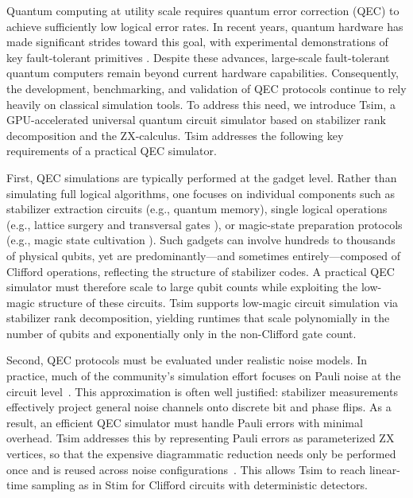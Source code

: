 \documentclass[
  a4paper,
  onecolumn,
  11pt,
  allowtoday
]{quantumarticle}
\begin{document}
Quantum computing at utility scale requires quantum error correction (QEC) to achieve sufficiently low logical error rates. In recent years, quantum hardware has made significant strides toward this goal, with experimental demonstrations of key fault-tolerant primitives \cite{google2023suppressing, ryan2024high, sales2025experimental, rosenfeld2025magic, bluvstein2026fault}. Despite these advances, large-scale fault-tolerant quantum computers remain beyond current hardware capabilities. Consequently, the development, benchmarking, and validation of QEC protocols continue to rely heavily on classical simulation tools. To address this need, we introduce Tsim, a GPU-accelerated universal quantum circuit simulator based on stabilizer rank decomposition and the ZX-calculus. Tsim addresses the following key requirements of a practical QEC simulator.

First, QEC simulations are typically performed at the gadget level. Rather than simulating full logical algorithms, one focuses on individual components such as stabilizer extraction circuits (e.g., quantum memory), single logical operations (e.g., lattice surgery and transversal gates \cite{horsman2012surface, zhou2024algorithmic}), or magic-state preparation protocols (e.g., magic state cultivation \cite{gidney2024magic}). Such gadgets can involve hundreds to thousands of physical qubits, yet are predominantly---and sometimes entirely---composed of Clifford operations, reflecting the structure of stabilizer codes. A practical QEC simulator must therefore scale to large qubit counts while exploiting the low-magic structure of these circuits.
Tsim supports low-magic circuit simulation via stabilizer rank decomposition, yielding runtimes that scale polynomially in the number of qubits and exponentially only in the non-Clifford gate count.

Second, QEC protocols must be evaluated under realistic noise models. In practice, much of the community's simulation effort focuses on Pauli noise at the circuit level~\cite{derks2025designing}. This approximation is often well justified: stabilizer measurements effectively project general noise channels onto discrete bit and phase flips. As a result, an efficient QEC simulator must handle Pauli errors with minimal overhead.
Tsim addresses this by representing Pauli errors as parameterized ZX vertices, so that the expensive diagrammatic reduction needs only be performed once and is reused across noise configurations~\cite{Sutcliffe_2025}. This allows Tsim to reach linear-time sampling as in Stim for Clifford circuits with deterministic detectors.
\end{document}
